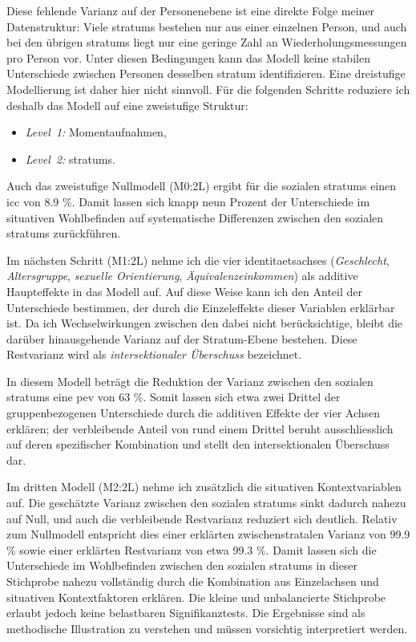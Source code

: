 Diese fehlende Varianz auf der Personenebene ist eine direkte Folge meiner Datenstruktur: Viele \glspl{stratum} bestehen nur aus einer einzelnen Person, und auch bei den übrigen \glspl{stratum} liegt nur eine geringe Zahl an Wiederholungsmessungen pro Person vor. Unter diesen Bedingungen kann das Modell keine stabilen Unterschiede zwischen Personen desselben \gls{stratum} identifizieren. Eine dreistufige Modellierung ist daher hier nicht sinnvoll. Für die folgenden Schritte reduziere ich deshalb das Modell auf eine zweistufige Struktur:

\begin{itemize}
    \item \emph{Level~1:} Momentaufnahmen,
    \item \emph{Level~2:} \glspl{stratum}.
\end{itemize}

Auch das zweistufige Nullmodell (M0:2L) ergibt für die sozialen \glspl{stratum} einen \gls{icc} von 8.9 \%. Damit lassen sich knapp neun Prozent der Unterschiede im situativen Wohlbefinden auf systematische Differenzen zwischen den sozialen \glspl{stratum} zurückführen.

Im nächsten Schritt (M1:2L) nehme ich die vier \glspl{identitaetsachse} (\emph{Geschlecht}, \emph{Altersgruppe}, \emph{sexuelle Orientierung}, \emph{Äquivalenzeinkommen}) als additive Haupteffekte in das Modell auf. Auf diese Weise kann ich den Anteil der Unterschiede bestimmen, der durch die Einzeleffekte dieser Variablen erklärbar ist. Da ich Wechselwirkungen zwischen den  dabei nicht berücksichtige, bleibt die darüber hinausgehende Varianz auf der Stratum-Ebene bestehen. Diese Restvarianz wird als \emph{intersektionaler Überschuss} bezeichnet.

In diesem Modell beträgt die Reduktion der Varianz zwischen den sozialen \glspl{stratum} eine \gls{pev} von 63 \%. Somit lassen sich etwa zwei Drittel der gruppenbezogenen Unterschiede durch die additiven Effekte der vier Achsen erklären; der verbleibende Anteil von rund einem Drittel beruht ausschliesslich auf deren spezifischer Kombination und stellt den intersektionalen Überschuss dar.

Im dritten Modell (M2:2L) nehme ich zusätzlich die situativen Kontextvariablen auf. Die geschätzte Varianz zwischen den sozialen \glspl{stratum} sinkt dadurch nahezu auf Null, und auch die verbleibende Restvarianz reduziert sich deutlich. Relativ zum Nullmodell entspricht dies einer erklärten zwischenstratalen Varianz von 99.9 \% sowie einer erklärten Restvarianz von etwa 99.3 \%. Damit lassen sich die Unterschiede im Wohlbefinden zwischen den sozialen \glspl{stratum} in dieser Stichprobe nahezu vollständig durch die Kombination aus Einzelachsen und situativen Kontextfaktoren erklären. Die kleine und unbalancierte Stichprobe erlaubt jedoch keine belastbaren Signifikanztests. Die Ergebnisse sind als methodische Illustration zu verstehen und müssen vorsichtig interpretiert werden.


